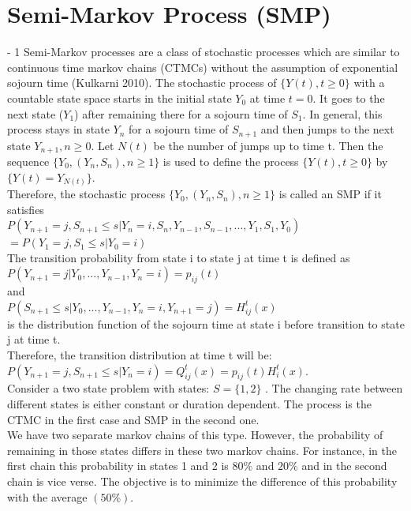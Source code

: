 \documentclass[12pt,letterpaper]{article}
\begin{document}
\section*{Semi-Markov Process (SMP)}\label{sec:Semi Markov Process (SMP)}
\looseness - 1
Semi-Markov processes are a class of stochastic processes which are similar to continuous time markov chains (CTMCs) without the assumption of exponential sojourn time (Kulkarni 2010). The stochastic process of $\{Y(t), t\ge 0\}$ with a countable state space starts in the initial state $Y_0$ at time $t=0$. It goes to the next state ($Y_1$) after remaining there for a sojourn time of $S_1$. In general, this process stays in state $Y_n$ for a sojourn time of $S_{n+1}$ and then jumps to the next state $Y_{n+1}, n\ge 0$. Let $N(t)$ be the number of jumps up to time t. Then the sequence  $\{Y_0, (Y_n, S_n), n\ge 1\}$ is used to define the process $\{Y(t), t\ge 0\}$ by $\{Y(t)=Y_{N(t)}\}$.\\
Therefore, the stochastic process $\{Y_0, (Y_n, S_n), n\ge 1\}$ is called an SMP if it satisfies \\
$P(Y_{n+1}=j, S_{n+1}\le s |Y_n=i, S_n, Y_{n-1}, S_{n-1},..., Y_1, S_1, Y_0)$\\
$=P(Y_1=j, S_1\le s |Y_0=i)$\\
The transition probability from state i to state j at time t is defined as\\
$P(Y_{n+1}=j|Y_0, ..., Y_{n-1},Y_{n}=i)=p_{ij}(t)$\\
and\\
$P(S_{n+1}\le s|Y_0, ..., Y_{n-1},Y_{n}=i,Y_{n+1}=j)=H_{ij}^t(x)$\\
is the distribution function of the sojourn time at state i before transition
to state j at time t.\\
Therefore, the transition distribution at time t will be:\\
$P(Y_{n+1}=j, S_{n+1}\le s |Y_n=i)=Q_{ij}^t(x)=p_{ij}(t)H_i^t(x)$.\\

Consider a two state problem with states: $S=\{1,2\}$ . The changing rate between different states is either constant or duration dependent. The process is the CTMC in the first case and SMP in the second one.\\
We have two separate markov chains of this type. However, the probability of remaining in those states differs in these two markov chains. For instance, in the first chain this probability in states 1 and 2 is $80\%$ and $20\%$ and in the second chain is vice verse. The objective is to minimize the difference of this probability with the average $(50\%)$. 
\end{document}
